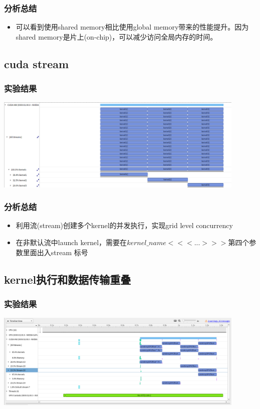\subsubsection{分析总结}
\noindent
\begin{itemize}
	\item 可以看到使用shared memory相比使用global memory带来的性能提升。因为shared memory是片上(on-chip)，可以减少访问全局内存的时间。
\end{itemize}

\subsection{cuda stream}
\subsubsection{实验结果}
\noindent
\includegraphics[width=0.9\textwidth]{assets/stream.png}
\subsubsection{分析总结}
\noindent
\begin{itemize}
	\item 利用流(stream)创建多个kernel的并发执行，实现grid level concurrency
	\item 在非默认流中launch kernel，需要在$kernel\_name<<<...>>>$第四个参数里面出入stream 标号
\end{itemize}


\subsection{kernel执行和数据传输重叠}
\subsubsection{实验结果}
\noindent
\includegraphics[width=0.9\textwidth]{assets/overlap.png}
